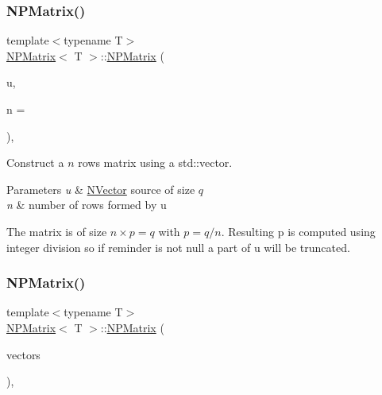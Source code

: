 \subsubsection{\texorpdfstring{NPMatrix()}{NPMatrix()}\hspace{0.1cm}{\footnotesize\ttfamily [5/7]}}
{\footnotesize\ttfamily template$<$typename T$>$ \\
\mbox{\hyperlink{class_n_p_matrix}{N\+P\+Matrix}}$<$ T $>$\+::\mbox{\hyperlink{class_n_p_matrix}{N\+P\+Matrix}} (\begin{DoxyParamCaption}\item[{const \mbox{\hyperlink{class_n_vector}{N\+Vector}}$<$ T $>$ \&}]{u,  }\item[{\mbox{\hyperlink{group___n_algebra_ga1b140a2034db3f5dfe18a987745df43a}{ul\+\_\+t}}}]{n = {} }\end{DoxyParamCaption})\hspace{0.3cm}{\ttfamily [inline]}, {\ttfamily [explicit]}}



Construct a $ n $ rows matrix using a {\ttfamily std\+::vector}. 


\begin{DoxyParams}{Parameters}
{\em u} & {\ttfamily \mbox{\hyperlink{class_n_vector}{N\+Vector}}} source of size $ q $ \\
\hline
{\em n} & number of rows formed by u\\
\hline
\end{DoxyParams}
The matrix is of size $ n \times p = q $ with $ p = q / n $. Resulting {\ttfamily p} is computed using integer division so if reminder is not null a part of {\ttfamily u} will be truncated. \mbox{\label{class_n_p_matrix_a844e2c006a3e53ea0d07a35bbe5ffd4e}} 
\subsubsection{\texorpdfstring{NPMatrix()}{NPMatrix()}\hspace{0.1cm}{\footnotesize\ttfamily [6/7]}}
{\footnotesize\ttfamily template$<$typename T$>$ \\
\mbox{\hyperlink{class_n_p_matrix}{N\+P\+Matrix}}$<$ T $>$\+::\mbox{\hyperlink{class_n_p_matrix}{N\+P\+Matrix}} (\begin{DoxyParamCaption}\item[{const vector$<$ \mbox{\hyperlink{class_n_vector}{N\+Vector}}$<$ T $>$ $>$ \&}]{vectors }\end{DoxyParamCaption})\hspace{0.3cm}{\ttfamily [inline]}, {\ttfamily [explicit]}}



